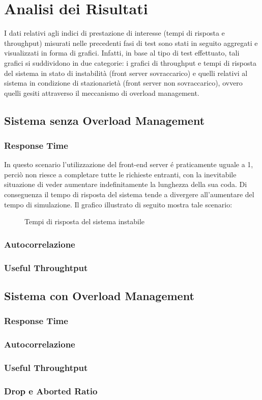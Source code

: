 \chapter{Analisi dei Risultati} 

I dati relativi agli indici di prestazione di interesse (tempi di risposta e throughput) misurati 
nelle precedenti fasi di test sono stati in seguito aggregati e visualizzati in forma di grafici. 
Infatti, in base al tipo di test effettuato, tali grafici si suddividono in due categorie: i grafici di 
throughput e tempi di risposta del sistema in stato di instabilit\`a (front server sovraccarico) e 
quelli relativi al sistema in condizione di stazionariet\`a (front server non sovraccarico), ovvero quelli gesiti
attraverso il meccanismo di overload management.

\section{Sistema senza Overload Management}

\subsection{Response Time}

In questo scenario l’utilizzazione del front-end server \'e praticamente uguale a 1, perci\`o 
non riesce a completare tutte le richieste entranti, con la inevitabile 
situazione di veder aumentare indefinitamente la lunghezza della sua coda. Di 
conseguenza il tempo di risposta del sistema tende a divergere all’aumentare del tempo di 
simulazione. Il grafico illustrato di seguito mostra tale scenario:

\begin{figure}[H]
 \centering
 \caption[Tempi di risposta del sistema instabile]{Tempi di risposta del sistema instabile}
 \label{fig:Tempi di risposta del sistema instabile}
\end{figure}


\subsection{Autocorrelazione}

\subsection{Useful Throughtput}

\section{Sistema con Overload Management}

\subsection{Response Time}

\subsection{Autocorrelazione}

\subsection{Useful Throughtput}

\subsection{Drop e Aborted Ratio}